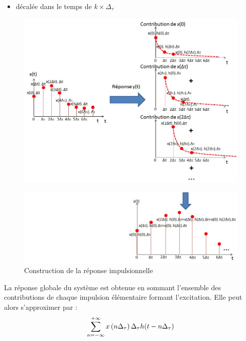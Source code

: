 \begin{remark}{}
\begin{itemize}
        \item décalée dans le temps de $ k \times \Delta_\tau $~
	\end{itemize}
	\begin{figure}[htbp]
          \centering
          \includegraphics[scale=0.5]{images/illustration_reponse_impuls.jpg}
	\end{figure}
	\begin{figure}[htbp]
          \centering
          \includegraphics[scale=0.6]{images/illustration_reponse_impuls_2.jpg}
          \caption{Construction de la réponse impulsionnelle}
          \label{Fig:illustration_reponse_impuls_2}
	\end{figure}

	La réponse globale du système est obtenue en sommant
        l'ensemble des contributions de chaque impulsion élémentaire
        formant l'excitation. Elle peut alors s'approximer par :
	\begin{equation*}\label{key}
          \sum_{n=-\infty}^{+\infty} x\left(n\Delta_\tau\right)  \Delta_\tau  h(t-n\Delta_\tau)
	\end{equation*}
	

\end{remark}
